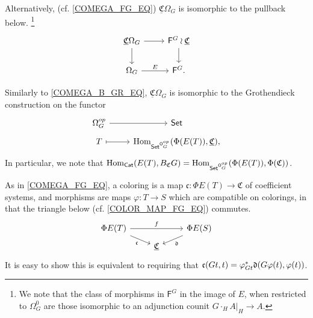\documentclass[a4paper,10pt
,draft
]{article}%
\renewcommand{\phi}{\varphi}
\newcommand{\UC}{\underline{\mathfrak C}}
\renewcommand{\1}{\ensuremath{\mathbb{id}}}
\begin{document}
\begin{remark}
      { \color{blue} %
        Alternatively, (cf. \eqref{COMEGA_FG_EQ})
        $\UC\Omega_G$ is isomorphic to the pullback below.
        \footnote{We note that the class of morphisms in $\mathsf F^G$ in the image of $E$, when restricted to $\Omega_G^0$
          are those isomorphic to an adjunction counit $G \cdot_H A|_H \to A$.}
        \begin{equation}
              \label{COMEGAG_FG_EQ}
              \begin{tikzcd}
                    \UC \Omega_G \arrow[d] \arrow[r]
                    &
                    \mathsf F^G \wr \underline{\mathfrak C} \arrow[d]
                    \\
                    \Omega_G \arrow[r, "E"]
                    &
                    \mathsf F^G.
              \end{tikzcd}
        \end{equation}
        
        Similarly to \eqref{COMEGA_B_GR_EQ}, $\underline{\mathfrak C}\Omega_G$ is isomorphic to the Grothendieck construction on the functor
        \begin{equation}
              \begin{tikzcd}[row sep = tiny]
                    \Omega_G^{op} \arrow[r]
                    &
                    \mathsf{Set}
                    \\
                    T \arrow[r, mapsto]
                    &
                    \Hom_{\Set^{\mathsf O_G^{op}}}(\Phi(E(T)), \underline{\mathfrak C}),
              \end{tikzcd}
        \end{equation}
        In particular, we note that
        $\operatorname{Hom}_{\mathsf{Cat}}(E(T), B_{\mathfrak C} G) = \operatorname{Hom}_{\mathsf{Set}^{\mathsf O_G^{op}}}(\Phi(E(T)), \Phi(\mathfrak C))$. 
        
        
        As in \eqref{COMEGA_FG_EQ}, a coloring is a map $\mathfrak c: \Phi E(T) \to \mathfrak C$ of coefficient systems,
        and morphisms are maps $\phi: T \to S$ which are compatible on colorings,
        in that the triangle below  (cf. \eqref{COLOR_MAP_FG_EQ}) commutes.
        \begin{equation}
              \begin{tikzcd}[row sep = tiny]
                    \Phi E(T) \arrow[rr, "f"] \arrow[dr, "\mathfrak c"']
                    &&
                    \Phi E(S) \arrow[dl, "\mathfrak d"]
                    \\
                    &
                    \underline{\mathfrak C}
              \end{tikzcd}
        \end{equation}
        It is easy to show this is equivalent to requiring that
        $\mathfrak c(G t, t) = \phi_{G t}^{\**} \mathfrak d(G \phi(t), \phi(t))$. 
        
}
\end{remark}
\end{document}
